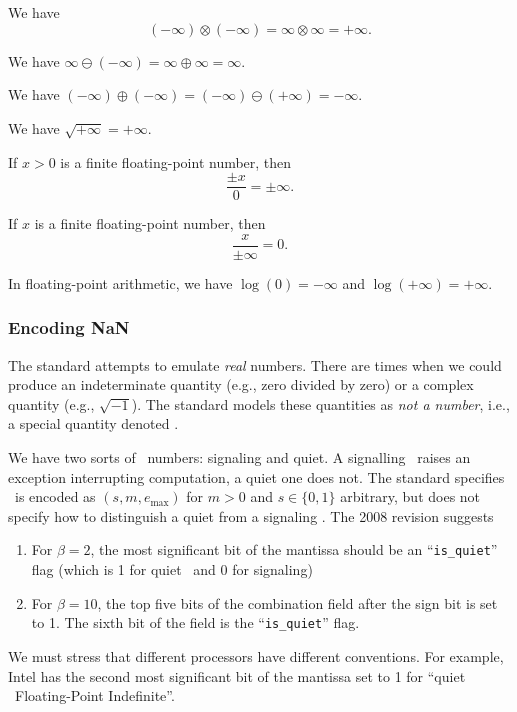 \begin{axiom}
  We have
  \begin{equation*}
    (-\infty)\otimes(-\infty) = \infty\otimes\infty = +\infty.
  \end{equation*}
\end{axiom}
\begin{axiom}
  We have $\infty\ominus(-\infty)=\infty\oplus\infty=\infty$.
\end{axiom}
\begin{axiom}
  We have $(-\infty)\oplus(-\infty)=(-\infty)\ominus(+\infty)=-\infty$.
\end{axiom}
\begin{axiom}
  We have $\sqrt{+\infty}=+\infty$.
\end{axiom}
\begin{axiom}
  If $x>0$ is a finite floating-point number, then
  \begin{equation*}
    \frac{\pm x}{0} = \pm\infty.
  \end{equation*}
\end{axiom}
\begin{axiom}
  If $x$ is a finite floating-point number, then
  \begin{equation*}
    \frac{x}{\pm\infty}=0.
  \end{equation*}
\end{axiom}
\begin{axiom}
 In floating-point arithmetic, we have $\log(0)=-\infty$ and $\log(+\infty)=+\infty$.
\end{axiom}

\subsubsection{Encoding NaN}

The  standard attempts to emulate \emph{real} numbers. There
are times when we could produce an indeterminate quantity (e.g., zero divided
by zero) or a complex quantity (e.g., $\sqrt{-1}$). The standard models
these quantities as \emph{not a number}, i.e., a special quantity
denoted \NaN.

We have two sorts of \NaN\ numbers: signaling and quiet. A signalling
\NaN\ raises an exception interrupting computation, a quiet one does
not. The  standard specifies \NaN\ is encoded as $(s,m,e_{\text{max}})$
for $m>0$ and $s\in\{0,1\}$ arbitrary, but does not specify how to
distinguish a quiet from a signaling \NaN. The 2008 revision suggests
\begin{enumerate}
\item For $\beta=2$, the most significant bit of the mantissa should be an
  ``\verb|is_quiet|'' flag (which is 1 for quiet \NaN\ and 0 for signaling)
\item For $\beta=10$, the top five bits of the combination field after
  the sign bit is set to 1. The sixth bit of the field is the ``\verb|is_quiet|''
  flag.
\end{enumerate}
We must stress that different processors have different conventions. For
example, Intel has the second most significant bit of the mantissa set
to 1 for ``quiet \NaN\ Floating-Point Indefinite''.

